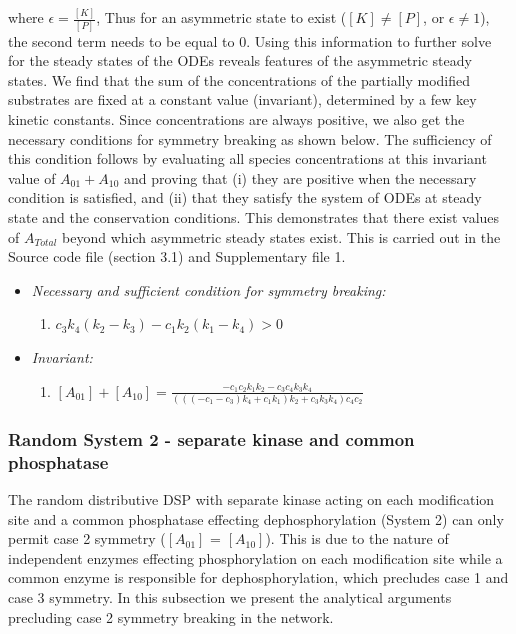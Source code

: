 \documentclass[9pt,lineno]{elife}
\begin{document}
\begin{appendixbox}
where $\epsilon = \frac{[K]}{[P]}$, Thus for an asymmetric state to exist ($[K] \neq [P]$, or $\epsilon \neq 1$), the second term needs to be equal to $0$. Using this information to further solve for the steady states of the ODEs  reveals features of the asymmetric steady states. We find that the sum of the concentrations of the partially modified substrates are fixed at a constant value (invariant), determined by a few key kinetic constants. Since concentrations are always positive, we also get the necessary conditions for symmetry breaking as shown below. The sufficiency of this condition follows by evaluating all species concentrations at this invariant value of $A_{01} + A_{10}$ and proving that (i) they are positive when the necessary condition is satisfied, and (ii) that they satisfy the system of ODEs at steady state and the conservation conditions. This demonstrates that there exist values of $A_{Total}$ beyond which asymmetric steady states exist. This is carried out in the Source code file (section 3.1) and Supplementary file 1.

\begin{itemize}
    \item \textit{Necessary and sufficient condition for symmetry breaking:}
    \begin{enumerate}
        \item $c_3k_4(k_2-k_3)-c_1k_2(k_1-k_4) > 0$
    \end{enumerate}
        \item \textit{Invariant:} 
    \begin{enumerate}
        \item $[A_{01}] + [A_{10}] = \frac{-c_1c_2k_1k_2-c_3c_4k_3k_4}{(((-c_1-c_3)k_4+c_1k_1)k_2+c_3k_3k_4)c_4c_2}$
    \end{enumerate}
\end{itemize}

\subsubsection*{Random System 2 - separate kinase and common phosphatase}

The random  distributive DSP with separate kinase acting on each modification site and a common phosphatase effecting dephosphorylation (System 2) can only permit case 2 symmetry ($[A_{01}]$ = $[A_{10}]$). This is due to the nature of independent enzymes effecting phosphorylation on each modification site while a common enzyme is responsible for dephosphorylation, which precludes case 1 and case 3 symmetry. In this subsection we present the analytical arguments precluding case 2 symmetry breaking in the network.


\end{appendixbox}
\end{document}
